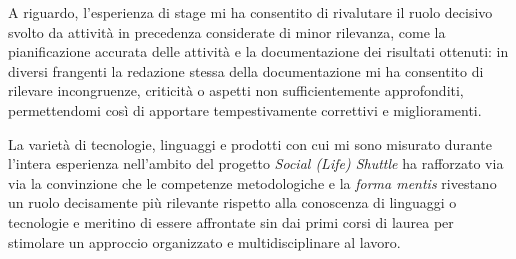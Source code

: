 A riguardo, l'esperienza di stage mi ha consentito di rivalutare il ruolo decisivo svolto da attività in precedenza considerate di minor rilevanza, come la pianificazione accurata delle attività e la documentazione dei risultati ottenuti: in diversi frangenti la redazione stessa della documentazione mi ha consentito di rilevare incongruenze, criticità o aspetti non sufficientemente approfonditi, permettendomi così di apportare tempestivamente correttivi e miglioramenti.

La varietà di tecnologie, linguaggi e prodotti con cui mi sono misurato durante l'intera esperienza nell'ambito del progetto \textit{Social (Life) Shuttle} ha rafforzato via via la convinzione che le competenze metodologiche e la \textit{forma mentis} rivestano un ruolo decisamente più rilevante rispetto alla conoscenza di linguaggi o tecnologie e meritino di essere affrontate sin dai primi corsi di laurea per stimolare un approccio organizzato e multidisciplinare al lavoro.